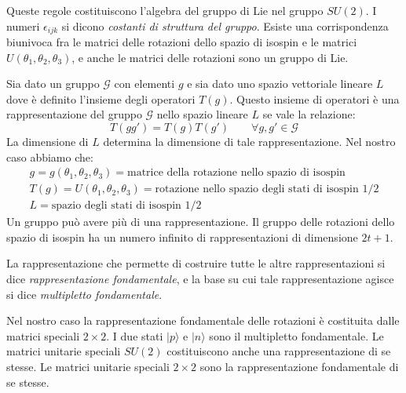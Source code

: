 Queste regole costituiscono l'algebra del gruppo di Lie nel gruppo $SU(2)$.
I numeri $\epsilon_{ijk}$ si dicono \textit{costanti di struttura del gruppo}.
Esiste una corrispondenza biunivoca fra le matrici delle rotazioni dello spazio
di isospin e le matrici $U(\theta_1,\theta_2,\theta_3)$, e anche le matrici
delle rotazioni sono un gruppo di Lie.

Sia dato un gruppo $\mathscr{G}$ con elementi $g$ e sia dato uno spazio
vettoriale lineare $L$ dove è definito l'insieme degli operatori $T(g)$.
Questo insieme di operatori è una rappresentazione del gruppo $\mathscr{G}$
nello spazio lineare $L$ se vale la relazione:
\[
T(gg')=T(g)T(g')\qquad \forall g,g'\in\mathscr{G}
\]
La dimensione di $L$ determina la dimensione di tale rappresentazione.
Nel nostro caso abbiamo che:
\begin{gather}
g=g(\theta_1,\theta_2,\theta_3)=\text{matrice della rotazione nello spazio di isospin}\\
T(g)=U(\theta_1,\theta_2,\theta_3)=\text{rotazione nello spazio degli stati di isospin $1/2$}\\
L=\text{spazio degli stati di isospin $1/2$}
\end{gather}
Un gruppo può avere più di una rappresentazione.
Il gruppo delle rotazioni dello spazio di isospin ha un numero infinito di
rappresentazioni di dimensione $2t+1$.

La rappresentazione che permette di costruire tutte le altre rappresentazioni si
dice \textit{rappresentazione fondamentale}, e la base su cui tale
rappresentazione agisce si dice \textit{multipletto fondamentale}.

Nel nostro caso la rappresentazione fondamentale delle rotazioni è costituita
dalle matrici speciali $2\times 2$.
I due stati $|p\rangle$ e $|n\rangle$ sono il multipletto fondamentale.
Le matrici unitarie speciali $SU(2)$ costituiscono anche una rappresentazione di
se stesse.
Le matrici unitarie speciali $2\times 2$ sono la rappresentazione fondamentale
di se stesse.

